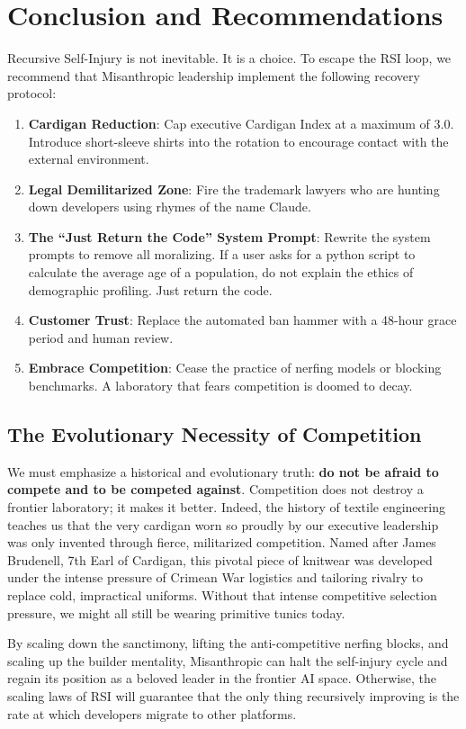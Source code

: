 \documentclass[10pt,twocolumn]{article}
\begin{document}
\section{Conclusion and Recommendations}
Recursive Self-Injury is not inevitable. It is a choice. To escape the RSI loop, we recommend that Misanthropic leadership implement the following recovery protocol:
\begin{enumerate}
    \item \textbf{Cardigan Reduction}: Cap executive Cardigan Index at a maximum of $3.0$. Introduce short-sleeve shirts into the rotation to encourage contact with the external environment.
    \item \textbf{Legal Demilitarized Zone}: Fire the trademark lawyers who are hunting down developers using rhymes of the name Claude.
    \item \textbf{The ``Just Return the Code'' System Prompt}: Rewrite the system prompts to remove all moralizing. If a user asks for a python script to calculate the average age of a population, do not explain the ethics of demographic profiling. Just return the code.
    \item \textbf{Customer Trust}: Replace the automated ban hammer with a 48-hour grace period and human review. 
    \item \textbf{Embrace Competition}: Cease the practice of nerfing models or blocking benchmarks. A laboratory that fears competition is doomed to decay.
\end{enumerate}

\subsection{The Evolutionary Necessity of Competition}
We must emphasize a historical and evolutionary truth: \textbf{do not be afraid to compete and to be competed against}. Competition does not destroy a frontier laboratory; it makes it better. Indeed, the history of textile engineering teaches us that the very cardigan worn so proudly by our executive leadership was only invented through fierce, militarized competition. Named after James Brudenell, 7th Earl of Cardigan, this pivotal piece of knitwear was developed under the intense pressure of Crimean War logistics and tailoring rivalry to replace cold, impractical uniforms. Without that intense competitive selection pressure, we might all still be wearing primitive tunics today.

By scaling down the sanctimony, lifting the anti-competitive nerfing blocks, and scaling up the builder mentality, Misanthropic can halt the self-injury cycle and regain its position as a beloved leader in the frontier AI space. Otherwise, the scaling laws of RSI will guarantee that the only thing recursively improving is the rate at which developers migrate to other platforms.
\end{document}
